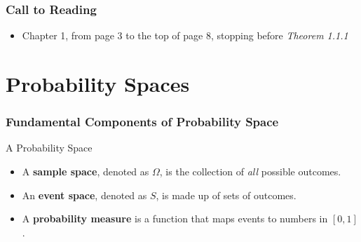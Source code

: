 \documentclass[12pt, block=fill]{beamer}
\begin{document}
\begin{frame}
  \frametitle{Call to Reading}
  \begin{itemize} 
  \item Chapter 1, from page 3 to the top of page 8, stopping before \textit{Theorem 1.1.1}
  \end{itemize}
\end{frame}


%



\section{Probability Spaces}

\begin{frame}
  \frametitle{Fundamental Components of Probability Space}
  \begin{block}{A Probability Space}
    \begin{itemize}
    \item A \textbf{sample space}, denoted as $\Omega$, is the
      collection of \textit{all} possible outcomes.
    \item An \textbf{event space}, denoted as $S$, is made up of sets of outcomes.
    \item A \textbf{probability measure} is a function that maps
      events to numbers in $[0,1]$.
    \end{itemize}
  \end{block}
\end{frame}
\end{document}
